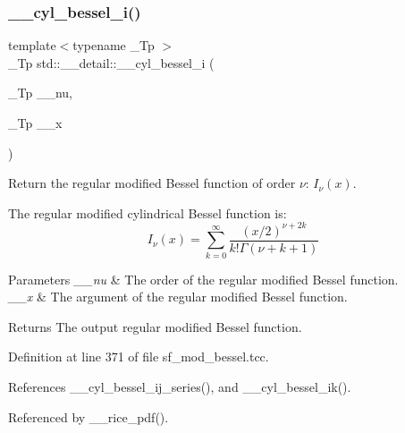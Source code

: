 \subsubsection{\texorpdfstring{\+\_\+\+\_\+cyl\+\_\+bessel\+\_\+i()}{\_\_cyl\_bessel\_i()}}
{\footnotesize\ttfamily template$<$typename \+\_\+\+Tp $>$ \\
\+\_\+\+Tp std\+::\+\_\+\+\_\+detail\+::\+\_\+\+\_\+cyl\+\_\+bessel\+\_\+i (\begin{DoxyParamCaption}\item[{\+\_\+\+Tp}]{\+\_\+\+\_\+nu,  }\item[{\+\_\+\+Tp}]{\+\_\+\+\_\+x }\end{DoxyParamCaption})}



Return the regular modified Bessel function of order $ \nu $\+: $ I_{\nu}(x) $. 

The regular modified cylindrical Bessel function is\+: \[ I_{\nu}(x) = \sum_{k=0}^{\infty} \frac{(x/2)^{\nu + 2k}}{k!\Gamma(\nu+k+1)} \]


\begin{DoxyParams}{Parameters}
{\em \+\_\+\+\_\+nu} & The order of the regular modified Bessel function. \\
\hline
{\em \+\_\+\+\_\+x} & The argument of the regular modified Bessel function. \\
\hline
\end{DoxyParams}
\begin{DoxyReturn}{Returns}
The output regular modified Bessel function. 
\end{DoxyReturn}


Definition at line 371 of file sf\+\_\+mod\+\_\+bessel.\+tcc.



References \+\_\+\+\_\+cyl\+\_\+bessel\+\_\+ij\+\_\+series(), and \+\_\+\+\_\+cyl\+\_\+bessel\+\_\+ik().



Referenced by \+\_\+\+\_\+rice\+\_\+pdf().

\mbox{\label{namespacestd_1_1____detail_a8b52f1f93a90b9ed2504521e0ea440f5}} 
